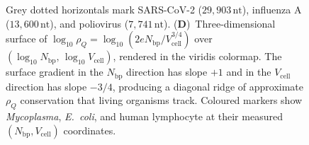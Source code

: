 \begin{figure}[!htbp]
{    Grey dotted horizontals mark SARS-CoV-2 ($29{,}903\,\mathrm{nt}$),
    influenza A ($13{,}600\,\mathrm{nt}$), and poliovirus ($7{,}741\,\mathrm{nt}$).
    (\textbf{D})~Three-dimensional surface of
    $\log_{10}\rho_Q = \log_{10}(2e N_{\mathrm{bp}} / V_{\mathrm{cell}}^{3/4})$
    over $(\log_{10} N_{\mathrm{bp}},\, \log_{10} V_{\mathrm{cell}})$,
    rendered in the viridis colormap.
    The surface gradient in the $N_{\mathrm{bp}}$ direction has slope $+1$
    and in the $V_{\mathrm{cell}}$ direction has slope $-3/4$, producing
    a diagonal ridge of approximate $\rho_Q$ conservation that living organisms
    track.
    Coloured markers show \textit{Mycoplasma}, \textit{E.~coli}, and human
    lymphocyte at their measured $(N_{\mathrm{bp}}, V_{\mathrm{cell}})$ coordinates.}
    \label{fig:viral_panel5}
\end{figure}

